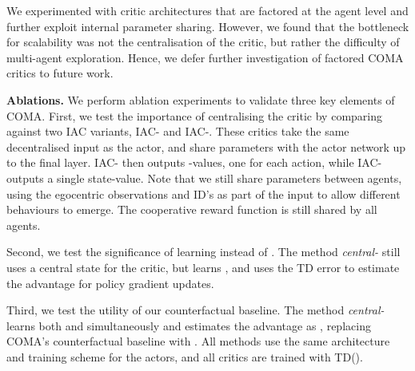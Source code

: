 \documentclass[letterpaper]{article}
\begin{document}
We experimented with critic architectures that are factored at the agent level and 
further exploit internal parameter sharing. However, we found that the 
bottleneck for scalability was not the centralisation of the critic, but rather 
the difficulty of multi-agent exploration.  Hence, we defer further 
investigation of factored COMA critics to future work.

\textbf{Ablations.}
We perform ablation experiments to validate three key elements of COMA. First, 
we test the importance of centralising the critic by comparing 
against two IAC variants, IAC- and IAC-. These critics take the same 
decentralised input as the actor, and share parameters with the actor network 
up to the final layer. IAC- then outputs  -values, one for 
each action, while IAC- outputs a single state-value. Note that we still 
share parameters between agents, using the egocentric observations and ID's as 
part of the input to allow different behaviours to emerge. The cooperative 
reward function is still shared by all agents.

Second, we test the significance of learning  instead of . The method 
\mbox{\emph{central-}} still uses a central state for the critic, but learns 
, and uses the TD error to estimate the advantage for policy gradient 
updates.

Third, we test the utility of our counterfactual baseline. The method 
\mbox{\emph{central-}} learns both  and  simultaneously and estimates 
the 
advantage as , replacing COMA's counterfactual baseline with .
All methods use the same architecture and training scheme for the actors, and 
all critics are trained with TD().
\end{document}
